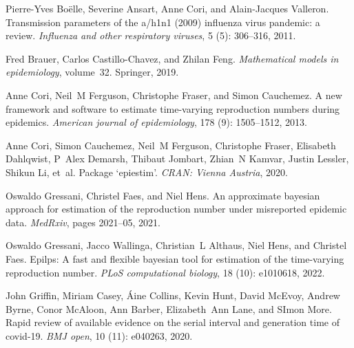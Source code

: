\documentclass[10pt,letterpaper]{article}
\begin{document}
\begin{thebibliography}{32}
  Pierre-Yves Bo{\"e}lle, Severine Ansart, Anne Cori, and Alain-Jacques Valleron.
  \newblock Transmission parameters of the a/h1n1 (2009) influenza virus
    pandemic: a review.
  \newblock \emph{Influenza and other respiratory viruses}, 5
    (5): 306--316, 2011.
  
  Fred Brauer, Carlos Castillo-Chavez, and Zhilan Feng.
  \newblock \emph{Mathematical models in epidemiology}, volume~32.
  \newblock Springer, 2019.
  
  Anne Cori, Neil~M Ferguson, Christophe Fraser, and Simon Cauchemez.
  \newblock A new framework and software to estimate time-varying reproduction
    numbers during epidemics.
  \newblock \emph{American journal of epidemiology}, 178 (9):
    1505--1512, 2013.
  
  Anne Cori, Simon Cauchemez, Neil~M Ferguson, Christophe Fraser, Elisabeth
    Dahlqwist, P~Alex Demarsh, Thibaut Jombart, Zhian~N Kamvar, Justin Lessler,
    Shikun Li, et~al.
  \newblock Package `epiestim'.
  \newblock \emph{CRAN: Vienna Austria}, 2020.
  
  Oswaldo Gressani, Christel Faes, and Niel Hens.
  \newblock An approximate bayesian approach for estimation of the reproduction
    number under misreported epidemic data.
  \newblock \emph{MedRxiv}, pages 2021--05, 2021.
  
  Oswaldo Gressani, Jacco Wallinga, Christian~L Althaus, Niel Hens, and Christel
    Faes.
  \newblock Epilps: A fast and flexible bayesian tool for estimation of the
    time-varying reproduction number.
  \newblock \emph{PLoS computational biology}, 18 (10):
    e1010618, 2022.
  
  John Griffin, Miriam Casey, {\'A}ine Collins, Kevin Hunt, David McEvoy, Andrew
    Byrne, Conor McAloon, Ann Barber, Elizabeth~Ann Lane, and SImon More.
  \newblock Rapid review of available evidence on the serial interval and
    generation time of covid-19.
  \newblock \emph{BMJ open}, 10 (11): e040263, 2020.
  

\end{thebibliography}
\end{document}
